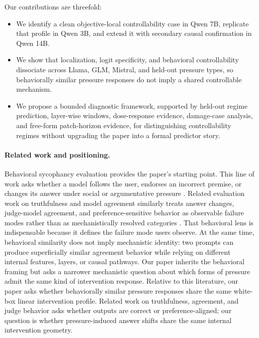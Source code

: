 \documentclass[11pt]{article}
\begin{document}
Our contributions are threefold:
\begin{itemize}
  \item We identify a clean objective-local controllability case in Qwen 7B, replicate that profile in Qwen 3B, and extend it with secondary causal confirmation in Qwen 14B.
  \item We show that localization, logit specificity, and behavioral controllability dissociate across Llama, GLM, Mistral, and held-out pressure types, so behaviorally similar pressure responses do not imply a shared controllable mechanism.
  \item We propose a bounded diagnostic framework, supported by held-out regime prediction, layer-wise windows, dose-response evidence, damage-case analysis, and free-form patch-horizon evidence, for distinguishing controllability regimes without upgrading the paper into a formal predictor story.
\end{itemize}

\paragraph{Related work and positioning.}

Behavioral sycophancy evaluation provides the paper's starting point.
This line of work asks whether a model follows the user, endorses an incorrect premise, or changes its answer under social or argumentative pressure \cite{perez2023modelwritten,jain2026interaction}.
Related evaluation work on truthfulness and model agreement similarly treats answer changes, judge-model agreement, and preference-sensitive behavior as observable failure modes rather than as mechanistically resolved categories \cite{lin2022truthfulqa,chiang2023judge}.
That behavioral lens is indispensable because it defines the failure mode users observe.
At the same time, behavioral similarity does not imply mechanistic identity: two prompts can produce superficially similar agreement behavior while relying on different internal features, layers, or causal pathways.
Our paper inherits the behavioral framing but asks a narrower mechanistic question about which forms of pressure admit the same kind of intervention response.
Relative to this literature, our paper asks whether behaviorally similar pressure responses share the same white-box linear intervention profile.
Related work on truthfulness, agreement, and judge behavior asks whether outputs are correct or preference-aligned; our question is whether pressure-induced answer shifts share the same internal intervention geometry.
\end{document}
